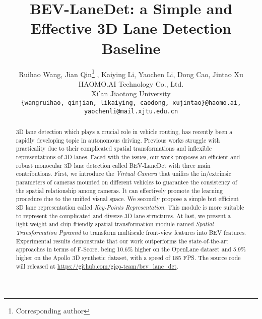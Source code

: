 \documentclass[10pt,twocolumn,letterpaper]{article}
\begin{document}
\title{BEV-LaneDet: a Simple and Effective 3D Lane Detection Baseline}

\author{Ruihao Wang, Jian Qin\thanks{Corresponding author} , Kaiying Li, Yaochen Li, Dong Cao, Jintao Xu\\
HAOMO.AI Technology Co., Ltd.\\
Xi’an Jiaotong University\\
{\tt\small  \{wangruihao, qinjian, likaiying, caodong, xujintao\}@haomo.ai, yaochenli@mail.xjtu.edu.cn} }
\maketitle

\begin{abstract}
   3D lane detection which plays a crucial role in vehicle routing, has recently been a rapidly developing topic in autonomous driving. Previous works struggle with practicality due to their complicated spatial transformations and inflexible representations of 3D lanes. Faced with the issues, our work proposes an efficient and robust monocular 3D lane detection called BEV-LaneDet with three main contributions. First, we introduce the \textit{Virtual Camera} that unifies the in/extrinsic parameters of cameras mounted on different vehicles to guarantee the consistency of the spatial relationship among cameras. It can effectively promote the learning procedure due to the unified visual space. We secondly propose a simple but efficient 3D lane representation called \textit{Key-Points Representation}. This module is more suitable to represent the complicated and diverse 3D lane structures. At last, we present a light-weight and chip-friendly spatial transformation module named \textit{Spatial Transformation Pyramid} to transform multiscale front-view features into BEV features. Experimental results demonstrate that our work outperforms the state-of-the-art approaches in terms of F-Score, being 10.6\% higher on the OpenLane dataset and 5.9\% higher on the Apollo 3D synthetic dataset, with a speed of 185 FPS. The source code will released at \url{https://github.com/gigo-team/bev_lane_det}.
\end{abstract}
\end{document}
